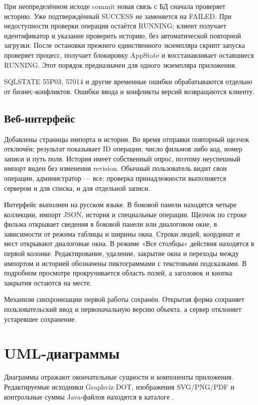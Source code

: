 При неопределённом исходе commit новая связь с БД сначала проверяет историю. Уже подтверждённый SUCCESS не заменяется на FAILED. При недоступности проверки операция остаётся RUNNING; клиент получает идентификатор и указание проверить историю, без автоматической повторной загрузки. После остановки прежнего единственного экземпляра скрипт запуска проверяет процесс, получает блокировку AppState и восстанавливает оставшиеся RUNNING. Этот порядок предназначен для одного экземпляра приложения.

SQLSTATE 55P03, 57014 и другие временные ошибки обрабатываются отдельно от бизнес-конфликтов. Ошибки ввода и конфликты версий возвращаются клиенту.

\subsection{Веб-интерфейс}
Добавлены страницы импорта и истории. Во время отправки повторный щелчок отключён; результат показывает ID операции, число фильмов либо код, номер записи и путь поля. История имеет собственный опрос, поэтому неуспешный импорт виден без изменения revision. Обычный пользователь видит свои операции, администратор --- все; проверка принадлежности выполняется сервером и для списка, и для отдельной записи.

Интерфейс выполнен на русском языке. В боковой панели находятся четыре коллекции, импорт JSON, история и специальные операции. Щелчок по строке фильма открывает сведения в боковой панели или диалоговом окне, в зависимости от режима таблицы и ширины окна. Строки людей, координат и мест открывают диалоговые окна. В режиме «Все столбцы» действия находятся в первой колонке. Редактирование, удаление, закрытие окна и переходы между импортом и историей обозначены пиктограммами с текстовыми подсказками. В подробном просмотре прокручивается область полей, а заголовок и кнопка закрытия остаются на месте.

Механизм синхронизации первой работы сохранён. Открытая форма сохраняет пользовательский ввод и первоначальную версию объекта, а сервер отклоняет устаревшее сохранение.

\section{UML-диаграммы}
Диаграммы отражают окончательные сущности и компоненты приложения. Редактируемые исходники Graphviz DOT, изображения SVG/PNG/PDF и контрольные суммы Java-файлов находятся в каталоге .

